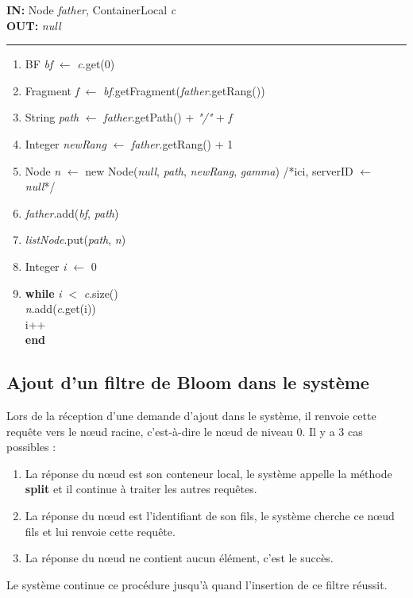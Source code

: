 \documentclass[a4paper,11pt]{report}
\begin{document}
\begin{flushleft}
	\begin{framed}
		\textbf{IN:} Node \textit{father}, ContainerLocal \textit{c}\\
		\textbf{OUT:} \textit{null}\\
		\noindent\rule{\linewidth}{0.5pt}

		\begin{enumerate}
			\item BF \textit{bf} $\leftarrow$ \textit{c}.get(0)
			\item Fragment \textit{f} $\leftarrow$ \textit{bf}.getFragment(\textit{father}.getRang())
			\item String \textit{path} $\leftarrow$ \textit{father}.getPath() + \textit{"/"} + \textit{f}
			\item Integer \textit{newRang} $\leftarrow$ \textit{father}.getRang() + 1
			\item Node \textit{n} $\leftarrow$ new Node(\textit{null}, \textit{path}, \textit{newRang}, \textit{gamma}) /*ici, serverID $\leftarrow$ \textit{null}*/
			\item \textit{father}.add(\textit{bf}, \textit{path})
			\item \textit{listNode}.put(\textit{path}, \textit{n})
			\item Integer \textit{i} $\leftarrow$ 0
			\item
				\begin{tabbing}
					\textbf{wh}\=\textbf{ile }\=\textit{i} $<$ \textit{c}.size()\\
						\> \textit{n}.add(\textit{c}.get(i))\\
						\> i++\\
					\textbf{end}
				\end{tabbing}									
		\end{enumerate}	
	\end{framed}
\end{flushleft}

	
\subsection{Ajout d'un filtre de Bloom dans le système}
	Lors de la réception d'une demande d'ajout dans le système, il renvoie cette requête vers le nœud racine, c'est-à-dire le nœud de niveau 0. Il y a 3 cas possibles : 
	\begin{enumerate}
		\item La réponse du nœud est son conteneur local, le système appelle la méthode \textbf{split} et il continue à traiter les autres requêtes.
		\item La réponse du nœud est l'identifiant de son fils, le système cherche ce nœud fils et lui renvoie cette requête.
		\item La réponse du nœud ne contient aucun élément, c'est le succès.
	\end{enumerate}
	Le système continue ce procédure jusqu'à quand l'insertion de ce filtre réussit.
	
\end{document}
